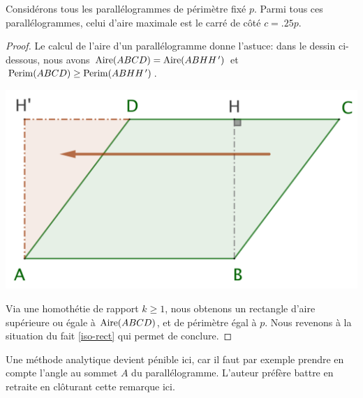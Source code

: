 \begin{fact}
	Considérons tous les parallélogrammes de périmètre fixé $p$. Parmi tous ces parallélogrammes, celui d'aire maximale est le carré de côté $c = \num{.25} p$.
\end{fact}


\begin{proof}
	Le calcul de l'aire d'un parallélogramme donne l'astuce:
	dans le dessin ci-dessous, nous avons 
	$\mathrm{Aire}(ABCD) = \mathrm{Aire}(ABHH^{\,\prime})$ et 
	$\mathrm{Perim}(ABCD) \geq \mathrm{Perim}(ABHH^{\,\prime})$.	

	\begin{center}
		\includegraphics[scale=.4]{content/parallelogram/parallelogram.png}
	\end{center}
	
	Via une homothétie de rapport $k \geq 1$, nous obtenons un rectangle d'aire supérieure ou égale à $\mathrm{Aire}(ABCD)$, et de périmètre égal à $p$. Nous revenons à la situation du fait \ref{iso-rect} qui permet de conclure.
\end{proof}


\begin{remark}
	Une méthode analytique devient pénible ici, car il faut par exemple prendre en compte l'angle au sommet $A$ du parallélogramme. L'auteur préfère battre en retraite en clôturant cette remarque ici.
\end{remark}
